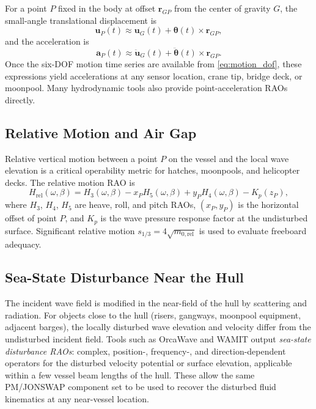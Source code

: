 \documentclass[journal,10pt,twocolumn]{IEEEtran}
\newcommand{\vect}[1]{\bm{#1}}
\begin{document}
    For a point $P$ fixed in the body at offset $\vect{r}_{GP}$ from the center of gravity
    $G$, the small-angle translational displacement is
    \begin{equation}
        \vect{u}_P(t) \approx \vect{u}_G(t) + \vect{\theta}(t)\times\vect{r}_{GP},
        \label{eq:point_disp}
    \end{equation}
    and the acceleration is
    \begin{equation}
        \vect{a}_P(t) \approx \ddot{\vect{u}}_G(t) + \ddot{\vect{\theta}}(t)\times\vect{r}_{GP}.
        \label{eq:point_accel}
    \end{equation}
    Once the six-DOF motion time series are available from \eqref{eq:motion_dof}, these
    expressions yield accelerations at any sensor location, crane tip, bridge deck, or
    moonpool.
    Many hydrodynamic tools also provide point-acceleration RAOs directly.

    \subsection{Relative Motion and Air Gap}
    \label{sec:relmotion}

    Relative vertical motion between a point $P$ on the vessel and the local wave elevation
    is a critical operability metric for hatches, moonpools, and helicopter decks.
    The relative motion RAO is
    \begin{equation}
        H_{\mathrm{rel}}(\omega,\beta)
        = H_3(\omega,\beta)
        - x_P H_5(\omega,\beta)
        + y_P H_4(\omega,\beta)
        - K_p(z_P),
        \label{eq:relmotion}
    \end{equation}
    where $H_3$, $H_4$, $H_5$ are heave, roll, and pitch RAOs, $(x_P,y_P)$ is the
    horizontal offset of point $P$, and $K_p$ is the wave pressure response factor at the
    undisturbed surface.
    Significant relative motion $s_{1/3}=4\sqrt{m_{0,\mathrm{rel}}}$ is used to evaluate
    freeboard adequacy.

    \subsection{Sea-State Disturbance Near the Hull}
    \label{sec:disturbance}

    The incident wave field is modified in the near-field of the hull by scattering and
    radiation.
    For objects close to the hull (risers, gangways, moonpool equipment, adjacent barges),
    the locally disturbed wave elevation and velocity differ from the undisturbed incident
    field.
    Tools such as OrcaWave and WAMIT output \emph{sea-state disturbance RAOs}: complex,
    position-, frequency-, and direction-dependent operators for the disturbed velocity
    potential or surface elevation, applicable within a few vessel beam lengths of the hull.
    These allow the same PM/JONSWAP component set to be used to recover the disturbed fluid
    kinematics at any near-vessel location.
\end{document}
